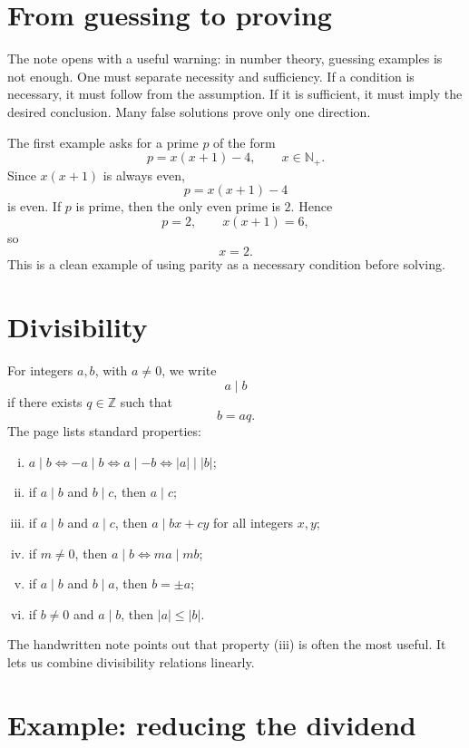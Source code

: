
\section{From guessing to proving}

The note opens with a useful warning: in number theory, guessing examples is not enough.  One must separate necessity and sufficiency.  If a condition is necessary, it must follow from the assumption.  If it is sufficient, it must imply the desired conclusion.  Many false solutions prove only one direction.

The first example asks for a prime \(p\) of the form
\[
  p=x(x+1)-4,\qquad x\in\mathbb N_+.
\]
Since \(x(x+1)\) is always even,
\[
  p=x(x+1)-4
\]
is even.  If \(p\) is prime, then the only even prime is \(2\).  Hence
\[
  p=2,\qquad x(x+1)=6,
\]
so
\[
  x=2.
\]
This is a clean example of using parity as a necessary condition before solving.

\section{Divisibility}

For integers \(a,b\), with \(a\neq0\), we write
\[
  a\mid b
\]
if there exists \(q\in\mathbb Z\) such that
\[
  b=aq.
\]
The page lists standard properties:
\begin{enumerate}[(i)]
  \item \(a\mid b\Longleftrightarrow -a\mid b\Longleftrightarrow a\mid -b\Longleftrightarrow |a|\mid |b|\);
  \item if \(a\mid b\) and \(b\mid c\), then \(a\mid c\);
  \item if \(a\mid b\) and \(a\mid c\), then \(a\mid bx+cy\) for all integers \(x,y\);
  \item if \(m\neq0\), then \(a\mid b\Longleftrightarrow ma\mid mb\);
  \item if \(a\mid b\) and \(b\mid a\), then \(b=\pm a\);
  \item if \(b\neq0\) and \(a\mid b\), then \(|a|\le |b|\).

\end{enumerate}

The handwritten note points out that property (iii) is often the most useful.  It lets us combine divisibility relations linearly.

\section{Example: reducing the dividend}

